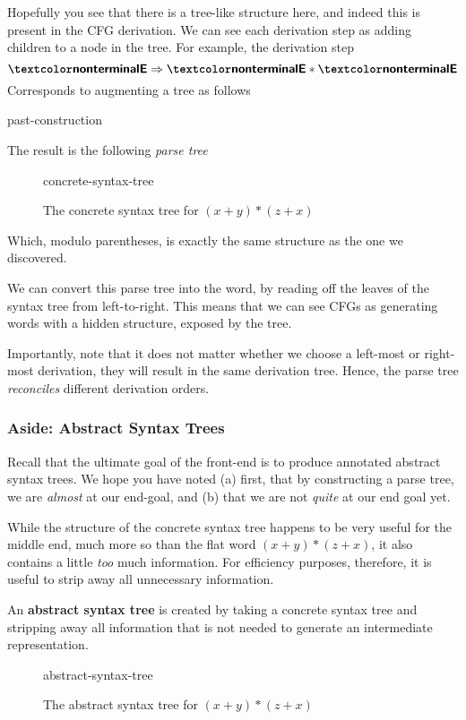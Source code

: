 Hopefully you see that there is a tree-like structure here, and indeed this is present in the CFG derivation. We can see each derivation step as adding children to a node in the tree. For example, the derivation step
\[\nonterminal{E} \Rightarrow \nonterminal{E} * \nonterminal{E}\]
Corresponds to augmenting a tree as follows
\begin{center}
    {past-construction}
\end{center}
The result is the following \textit{parse tree}

\begin{figure}[H]
    \centering
    {concrete-syntax-tree}
    \caption{The concrete syntax tree for $(x+y)*(z+x)$}
    \label{fig:par-cst}
\end{figure}

Which, modulo parentheses, is exactly the same structure as the one we discovered. 

We can convert this parse tree into the word, by reading off the leaves of the syntax tree from left-to-right. This means that we can see CFGs as generating words with a hidden structure, exposed by the tree.

Importantly, note that it does not matter whether we choose a left-most or right-most derivation, they will result in the same derivation tree. Hence, the parse tree \textit{reconciles} different derivation orders. 

\subsubsection{Aside: Abstract Syntax Trees}
Recall that the ultimate goal of the front-end is to produce annotated abstract syntax trees. We hope you have noted (a) first, that by constructing a parse tree, we are \textit{almost} at our end-goal, and (b) that we are not \textit{quite} at our end goal yet.

While the structure of the concrete syntax tree happens to be very useful for the middle end, much more so than the flat word $(x+y)*(z+x)$, it also contains a little \textit{too} much information. For efficiency purposes, therefore, it is useful to strip away all unnecessary information. 

An \textbf{abstract syntax tree} is created by taking a concrete syntax tree and stripping away all information that is not needed to generate an intermediate representation. 

\begin{figure}[H]
    \centering
    {abstract-syntax-tree}
    \caption{The abstract syntax tree for $(x+y)*(z+x)$}
    \label{fig:par-ast}
\end{figure}

